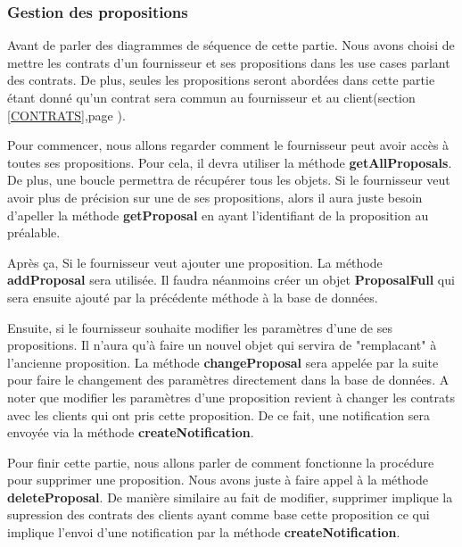 \subsubsection{Gestion des propositions}
\begin{flushleft}
Avant de parler des diagrammes de séquence de cette partie. Nous avons choisi de mettre les contrats d'un fournisseur et ses propositions dans les use cases parlant des contrats. De plus, seules les propositions seront abordées dans cette partie étant donné qu'un contrat sera commun au fournisseur et au client(section \ref{CONTRATS},page \pageref{CONTRATS}).
\end{flushleft}

\begin{flushleft}
Pour commencer, nous allons regarder comment le fournisseur peut avoir accès à toutes ses propositions. Pour cela, il devra utiliser la méthode \textbf{getAllProposals}. De plus, une boucle permettra de récupérer tous les objets. Si le fournisseur veut avoir plus de précision sur une de ses propositions, alors il aura juste besoin d'apeller la méthode \textbf{getProposal} en ayant l'identifiant de la proposition au préalable.
\end{flushleft}
\begin{flushleft}
Après ça, Si le fournisseur veut ajouter une proposition. La méthode \textbf{addProposal} sera utilisée. Il faudra néanmoins créer un objet \textbf{ProposalFull} qui sera ensuite ajouté par la précédente méthode à la base de données. 
\end{flushleft}

\begin{flushleft}
Ensuite, si le fournisseur souhaite modifier les paramètres d'une de ses propositions. Il n'aura qu'à faire un nouvel objet qui servira de "remplacant" à l'ancienne proposition. La méthode \textbf{changeProposal} sera appelée par la suite pour faire le changement des paramètres directement dans la base de données. A noter que modifier les paramètres d'une proposition revient à changer les contrats avec les clients qui ont pris cette proposition. De ce fait, une notification sera envoyée via la méthode \textbf{createNotification}.
\end{flushleft}

\begin{flushleft}
Pour finir cette partie, nous allons parler de comment fonctionne la procédure pour supprimer une proposition. Nous avons juste à faire appel à la méthode \textbf{deleteProposal}. De manière similaire au fait de modifier, supprimer implique la supression des contrats des clients ayant comme base cette proposition ce qui implique l'envoi d'une notification par la méthode \textbf{createNotification}.
\end{flushleft}

